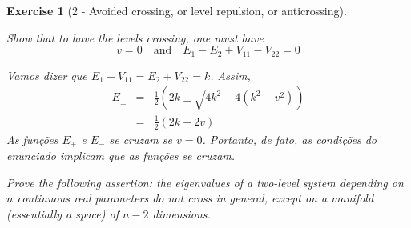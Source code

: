\documentclass[12pt]{article}
\def\be{\begin{equation}}
\def\ee{\end{equation}}
\def\bea{\begin{eqnarray*}}
\def\eea{\end{eqnarray*}}
\def\f{\frac}
\def\l{\left}
\def\r{\right}
\newtheorem{exercise}{Exercise}
\begin{document}
\begin{exercise}[2 - Avoided crossing, or level repulsion, or anticrossing]
\begin{exercises}
			\item Show that to have the levels crossing, one must have
			\be
				v=0 \quad \text{and} \quad E_1 - E_2 + V_{11} - V_{22} = 0
			\ee
			\begin{multianswer}
				Vamos dizer que $E_1+V_{11} = E_2+V_{22}=k$. Assim,
				\bea
					E_\pm &=& \f{1}{2}\l( 2k \pm \sqrt{4k^2 - 4(k^2-v^2)}\r) \\
						&=& \f{1}{2}\l( 2k \pm 2v\r)
				\eea
				As funções $E_+$ e $E_-$ se cruzam se $v=0$. Portanto, de fato, as condições do enunciado implicam que as funções se cruzam. 	
			\end{multianswer}
			
			\item Prove the following assertion: the eigenvalues of a two-level system depending on $n$ continuous real parameters do not cross in general, except on a manifold (essentially a space) of $n-2$ dimensions.
			\begin{multianswer}[true]
				
			\end{multianswer}
			
			
		\end{exercises}
		
	\end{exercise}
	
	
\end{document}
